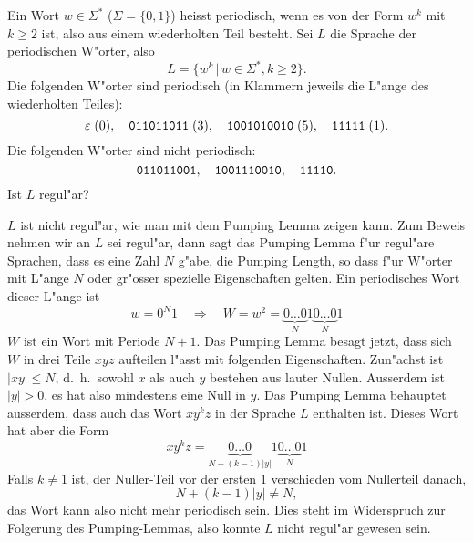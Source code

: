 Ein Wort $w\in\Sigma^*$ ($\Sigma=\{0,1\}$) heisst periodisch, wenn
es von der Form $w^k$ mit $k\ge 2$  ist, also aus einem wiederholten
Teil besteht. Sei $L$ die Sprache der periodischen W"orter, also
\[
L=\{w^k \,|\,w\in\Sigma^*,k\ge 2\}.
\]
Die folgenden W"orter sind periodisch (in Klammern jeweils die L"ange
des wiederholten Teiles):
\[
\varepsilon\;(0),\quad
\text{\tt 011011011}\;(3),\quad
\text{\tt 1001010010}\;(5),\quad
\text{\tt 11111}\;(1).
\]
Die folgenden W"orter sind nicht periodisch:
\[
\text{\tt 011011001},\quad
\text{\tt 1001110010},\quad
\text{\tt 11110}.
\]
Ist $L$ regul"ar?

\begin{loesung}
$L$ ist nicht regul"ar, wie man mit dem Pumping Lemma zeigen kann. Zum Beweis
nehmen wir an $L$ sei regul"ar, dann sagt das Pumping Lemma f"ur
regul"are Sprachen, dass es
eine Zahl $N$ g"abe, die Pumping Length, so dass f"ur W"orter mit
L"ange $N$ oder gr"osser spezielle Eigenschaften gelten.
Ein periodisches Wort dieser L"ange ist
\[
w=0^N1\quad\Rightarrow\quad
W=w^2=\underbrace{0\dots 0}_N1\underbrace{0\dots 0}_N1
\]
$W$ ist ein Wort mit Periode $N+1$. Das Pumping Lemma besagt jetzt, dass
sich $W$ in drei Teile $xyz$ aufteilen l"asst mit folgenden Eigenschaften.
Zun"achst ist $|xy|\le N$, d.~h.~sowohl $x$ als auch $y$ bestehen aus
lauter Nullen. Ausserdem ist $|y|>0$, es hat also mindestens eine Null
in $y$. Das Pumping Lemma behauptet ausserdem, dass auch das Wort
$xy^kz$ in der Sprache $L$ enthalten ist. Dieses Wort hat aber die
Form
\[
xy^kz=\underbrace{0\dots0}_{N+(k-1)|y|}1\underbrace{0\dots 0}_N1
\]
Falls $k\ne 1$ ist, der Nuller-Teil vor der ersten $1$ verschieden vom
Nullerteil danach,
\[
N+(k-1)|y|\ne N,
\]
das Wort kann also nicht mehr periodisch
sein. Dies steht im Widerspruch zur Folgerung des Pumping-Lemmas, also
konnte $L$ nicht regul"ar gewesen sein.
\end{loesung}
